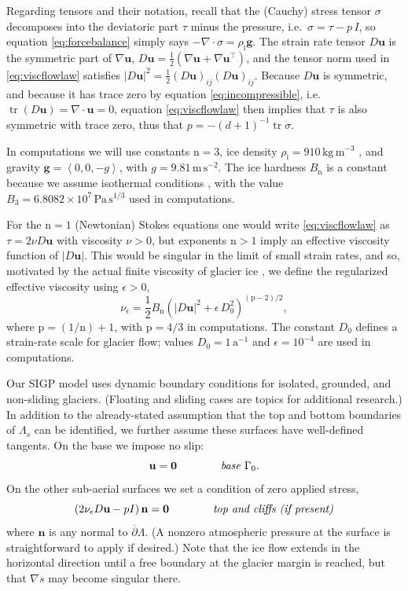 \documentclass[letterpaper,final,12pt,reqno]{amsart}
\theoremstyle{claim}
\newcommand{\eps}{\epsilon}
\newcommand{\grad}{\nabla}
\newcommand{\Div}{\nabla\cdot}
\newcommand{\trace}{\operatorname{tr}}
\newcommand{\bg}{\mathbf{g}}
\newcommand{\bn}{\mathbf{n}}
\newcommand{\bu}{\mathbf{u}}
\newcommand{\bzero}{\bm{0}}
\newcommand{\rhoi}{\rho_{\text{i}}}
\newcommand{\nn}{{\text{n}}}
\newcommand{\pp}{{\text{p}}}
\numberwithin{equation}{section}
\numberwithin{figure}{section}
\numberwithin{table}{section}
\numberwithin{theorem}{section}
\begin{document}
Regarding tensors and their notation, recall that the (Cauchy) stress tensor $\sigma$ decomposes into the deviatoric part $\tau$ minus the pressure, i.e.~$\sigma = \tau - p\,I$, so equation \eqref{eq:forcebalance} simply says $-\Div \sigma = \rhoi \bg$.  The strain rate tensor $D\bu$ is the symmetric part of $\grad \bu$, $D\bu = \frac{1}{2} \left(\grad\bu + \grad\bu^\top\right)$, and the tensor norm used in \eqref{eq:viscflowlaw} satisfies $|D\bu|^2 = \frac{1}{2} (D\bu)_{ij} (D\bu)_{ij}$.  Because $D\bu$ is symmetric, and because it has trace zero by equation \eqref{eq:incompressible}, i.e.~$\trace(D\bu)=\nabla \cdot \bu = 0$, equation \eqref{eq:viscflowlaw} then implies that $\tau$ is also symmetric with trace zero, thus that $p=-(d+1)^{-1} \trace \sigma$.

In computations we will use constants $\nn=3$, ice density $\rhoi=910 \,\text{kg}\,\text{m}^{-3}$ \cite{Huybrechtsetal1996}, and gravity $\bg=\left<0,0,-g\right>$, with $g=9.81\,\text{m}\,\text{s}^{-2}$.  The ice hardness $B_\nn$ is a constant because we assume isothermal conditions \cite{GreveBlatter2009}, with the value $B_3=6.8082\times 10^7\,\text{Pa}\,\text{s}^{1/3}$ \cite{Huybrechtsetal1996} used in computations.

For the $\nn=1$ (Newtonian) Stokes equations one would write \eqref{eq:viscflowlaw} as $\tau = 2\nu D\bu$ with viscosity $\nu>0$, but exponents $\nn>1$ imply an effective viscosity function of $|D\bu|$.  This would be singular in the limit of small strain rates, and so, motivated by the actual finite viscosity of glacier ice \cite{GreveBlatter2009}, we define the regularized effective viscosity using $\eps>0$,
\begin{equation}
\nu_\eps = \frac{1}{2} B_\nn \left(|D\bu|^2 + \eps\, D_0^2\right)^{(\pp-2)/2}, \label{eq:regeffvisc}
\end{equation}
where $\pp=(1/\nn)+1$, with $\pp=4/3$ in computations.  The constant $D_0$ defines a strain-rate scale for glacier flow; values $D_0 = 1 \,\text{a}^{-1}$ and $\eps = 10^{-4}$ are used in computations.

Our SIGP model uses dynamic boundary conditions for isolated, grounded, and non-sliding glaciers.  (Floating and sliding cases are topics for additional research.)  In addition to the already-stated assumption that the top and bottom boundaries of $\Lambda_s$ can be identified, we further assume these surfaces have well-defined tangents.  On the base we impose no slip:
\begin{equation}
\bu = \bzero  \qquad\qquad \text{\emph{base} } \Gamma_0. \label{eq:basebc}
\end{equation}
On the other sub-aerial surfaces we set a condition of zero applied stress,
\begin{equation}
\left(2 \nu_\eps D\bu - pI\right) \bn = \bzero  \qquad \qquad \text{\emph{top and cliffs (if present)}} \label{eq:topbc}
\end{equation}
where $\bn$ is any normal to $\overline{\partial} \Lambda$.  (A nonzero atmospheric pressure at the surface is straightforward to apply if desired.)  Note that the ice flow extends in the horizontal direction until a free boundary at the glacier margin is reached, but that $\grad s$ may become singular there.
\end{document}
